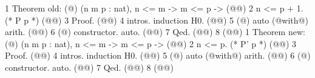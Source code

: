 1  Theorem old: (@\ltacforall@) (n m p : nat), n <= m -> m <= p ->  (@\vspace{-0.05cm}@)
2    n <= p + 1.                     (* P p *) (@\vspace{-0.05cm}@)
3  Proof.  (@\vspace{-0.05cm}@)
4    intros. induction H0.  (@\vspace{-0.05cm}@)
5    (@\ltacba@) auto (@with@) arith.  (@\vspace{-0.05cm}@)
6    (@\ltacba@) constructor. auto.  (@\vspace{-0.05cm}@)
7  Qed.  (@\vspace{-0.05cm}@)
8  (@\vspace{-0.05cm}@)
1  Theorem new: (@\ltacforall@) (n m p : nat), n <= m -> m <= p ->  (@\vspace{-0.05cm}@)
2    n <= p.                     (* P' p *) (@\vspace{-0.05cm}@)
3  Proof.  (@\vspace{-0.05cm}@)
4    intros. induction H0.  (@\vspace{-0.05cm}@)
5    (@\ltacba@) auto (@with@) arith.  (@\vspace{-0.05cm}@)
6    (@\ltacba@) constructor. auto.  (@\vspace{-0.05cm}@)
7  Qed.  (@\vspace{-0.05cm}@)
8  (@\vspace{-0.05cm}@)
